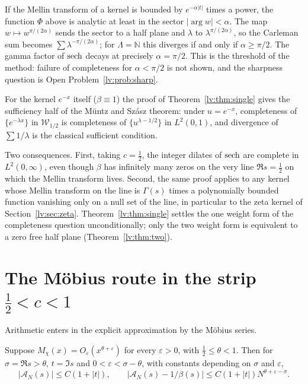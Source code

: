 \begin{remark}\label{lv:rem:threshold}
If the Mellin transform of a kernel is bounded by $e^{-\alpha|t|}$ times a power, the function $\Phi$ above is analytic at least in the sector $|\arg w|<\alpha$. The map $w\mapsto w^{\pi/(2\alpha)}$ sends the sector to a half plane and $\lambda$ to $\lambda^{\pi/(2\alpha)}$, so the Carleman sum becomes $\sum\lambda^{-\pi/(2\alpha)}$; for $\Lambda=\mathbb N$ this diverges if and only if $\alpha\ge\pi/2$. The gamma factor of $\operatorname{sech}$ decays at precisely $\alpha=\pi/2$. This is the threshold of the method: failure of completeness for $\alpha<\pi/2$ is not shown, and the sharpness question is Open Problem~\ref{lv:prob:sharp}.
\end{remark}

\begin{remark}
For the kernel $e^{-x}$ itself ($\beta\equiv1$) the proof of Theorem~\ref{lv:thm:single} gives the sufficiency half of the M\"untz and Sz\'asz theorem: under $u=e^{-x}$, completeness of $\{e^{-\lambda x}\}$ in $\mathcal W_{1/2}$ is completeness of $\{u^{\lambda-1/2}\}$ in $L^2(0,1)$, and divergence of $\sum1/\lambda$ is the classical sufficient condition.
\end{remark}

Two consequences. First, taking $c=\frac12$, the integer dilates of $\operatorname{sech}$ are complete in $L^2(0,\infty)$, even though $\beta$ has infinitely many zeros on the very line $\Re s=\frac12$ on which the Mellin transform lives. Second, the same proof applies to any kernel whose Mellin transform on the line is $\Gamma(s)$ times a polynomially bounded function vanishing only on a null set of the line, in particular to the zeta kernel of Section~\ref{lv:sec:zeta}. Theorem~\ref{lv:thm:single} settles the one weight form of the completeness question unconditionally; only the two weight form is equivalent to a zero free half plane (Theorem~\ref{lv:thm:two}).

\section{The M\"obius route in the strip $\frac12<c<1$}\label{lv:sec:strip}

Arithmetic enters in the explicit approximation by the M\"obius series.

\begin{lemma}\label{lv:lem:ps}
Suppose $M_\chi(x)=O_\varepsilon(x^{\theta+\varepsilon})$ for every $\varepsilon>0$, with $\frac12\le\theta<1$. Then for $\sigma=\Re s>\theta$, $t=\Im s$ and $0<\varepsilon<\sigma-\theta$, with constants depending on $\sigma$ and $\varepsilon$,
\[
|\mathcal A_N(s)|\le C(1+|t|),\qquad|\mathcal A_N(s)-1/\beta(s)|\le C(1+|t|)N^{\theta+\varepsilon-\sigma}.
\]
\end{lemma}

